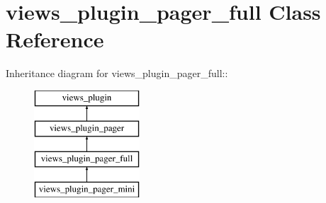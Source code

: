 \hypertarget{classviews__plugin__pager__full}{
\section{views\_\-plugin\_\-pager\_\-full Class Reference}
\label{classviews__plugin__pager__full}
}
Inheritance diagram for views\_\-plugin\_\-pager\_\-full::\begin{figure}[H]
\begin{center}
\leavevmode
\includegraphics[height=4cm]{classviews__plugin__pager__full}
\end{center}
\end{figure}
